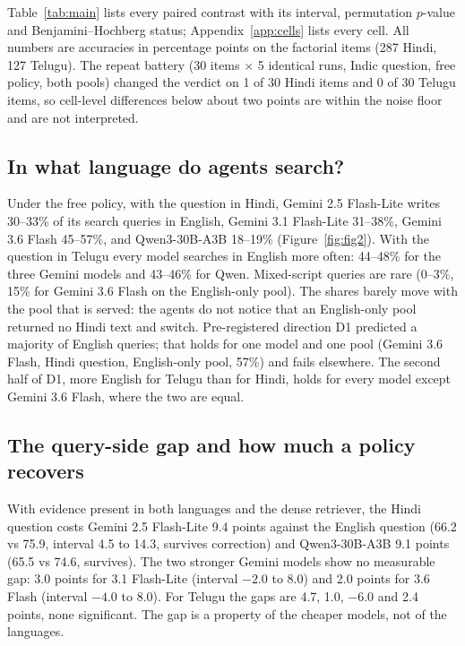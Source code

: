Table~\ref{tab:main} lists every paired contrast with its interval, permutation $p$-value and Benjamini--Hochberg status; Appendix~\ref{app:cells} lists every cell. All numbers are accuracies in percentage points on the factorial items (287 Hindi, 127 Telugu). The repeat battery (30 items $\times$ 5 identical runs, Indic question, free policy, both pools) changed the verdict on 1 of 30 Hindi items and 0 of 30 Telugu items, so cell-level differences below about two points are within the noise floor and are not interpreted.

\subsection{In what language do agents search?}
\label{sec:results-drift}

Under the free policy, with the question in Hindi, Gemini 2.5 Flash-Lite writes 30--33\% of its search queries in English, Gemini 3.1 Flash-Lite 31--38\%, Gemini 3.6 Flash 45--57\%, and Qwen3-30B-A3B 18--19\% (Figure~\ref{fig:fig2}). With the question in Telugu every model searches in English more often: 44--48\% for the three Gemini models and 43--46\% for Qwen. Mixed-script queries are rare (0--3\%, 15\% for Gemini 3.6 Flash on the English-only pool). The shares barely move with the pool that is served: the agents do not notice that an English-only pool returned no Hindi text and switch. Pre-registered direction D1 predicted a majority of English queries; that holds for one model and one pool (Gemini 3.6 Flash, Hindi question, English-only pool, 57\%) and fails elsewhere. The second half of D1, more English for Telugu than for Hindi, holds for every model except Gemini 3.6 Flash, where the two are equal.

\subsection{The query-side gap and how much a policy recovers}
\label{sec:results-qg}

With evidence present in both languages and the dense retriever, the Hindi question costs Gemini 2.5 Flash-Lite 9.4 points against the English question (66.2 vs 75.9, interval 4.5 to 14.3, survives correction) and Qwen3-30B-A3B 9.1 points (65.5 vs 74.6, survives). The two stronger Gemini models show no measurable gap: 3.0 points for 3.1 Flash-Lite (interval $-2.0$ to $8.0$) and 2.0 points for 3.6 Flash (interval $-4.0$ to $8.0$). For Telugu the gaps are 4.7, 1.0, $-6.0$ and 2.4 points, none significant. The gap is a property of the cheaper models, not of the languages.

